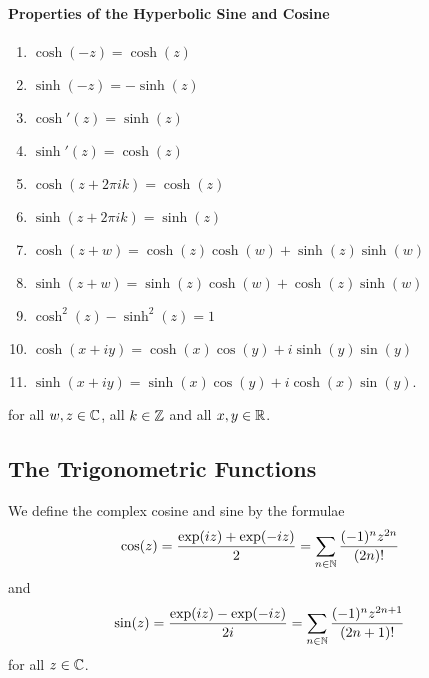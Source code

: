 \paragraph{Properties of the Hyperbolic Sine and Cosine}
\begin{enumerate}[label=(\roman*)]
    \item \(\cosh(-z) = \cosh(z)\)
    \item \(\sinh(-z) = -\sinh(z)\)
    \item \(\cosh'(z) = \sinh(z)\)
    \item \(\sinh'(z) = \cosh(z)\)
    \item \(\cosh(z + 2\pi ik) = \cosh(z)\)
    \item \(\sinh(z + 2\pi ik) = \sinh(z)\)
    \item \(\cosh(z + w) = \cosh(z)\cosh(w) + \sinh(z)\sinh(w)\)
    \item \(\sinh(z + w) = \sinh(z)\cosh(w) + \cosh(z)\sinh(w)\)
    \item \(\cosh^2(z) - \sinh^2(z) = 1\)
    \item \(\cosh(x + iy) = \cosh(x)\cos(y) + i\sinh(y)\sin(y)\)
    \item \(\sinh(x + iy) = \sinh(x)\cos(y) + i\cosh(x)\sin(y)\).
\end{enumerate}
for all \(w, z \in \mathbb{C}\), all \(k \in \mathbb{Z}\) and all \(x,y \in \mathbb{R}\).

\subsection{The Trigonometric Functions}
We define the complex cosine and sine by the formulae
\[\cos(z) = \frac{\exp(iz) + \exp(-iz)}{2} = \sum_{n \in \mathbb{N}}\frac{(-1)^n z^{2n}}{(2n)!}\]
and
\[\sin(z) = \frac{\exp(iz) - \exp(-iz)}{2i} = \sum_{n \in \mathbb{N}} \frac{(-1)^n z^{2n + 1}}{(2n + 1)!}\]
for all \(z \in \mathbb{C}\).